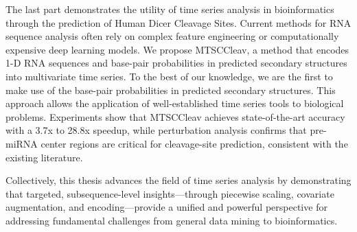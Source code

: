 The last part demonstrates the utility of time series analysis in bioinformatics through the prediction of Human Dicer Cleavage Sites. 
%
Current methods for RNA sequence analysis often rely on complex feature engineering or computationally expensive deep learning models. 
We propose MTSCCleav, a method that encodes 1-D RNA sequences and base-pair probabilities in predicted secondary structures into multivariate time series.
To the best of our knowledge, we are the first to make use of the base-pair probabilities in predicted secondary structures.
This approach allows the application of well-established time series tools to biological problems. 
Experiments show that MTSCCleav achieves state-of-the-art accuracy with a 3.7x to 28.8x speedup, while perturbation analysis confirms that pre-miRNA center regions are critical for cleavage-site prediction, consistent with the existing literature.

Collectively, this thesis advances the field of time series analysis by demonstrating that targeted, subsequence-level insights—through piecewise scaling, covariate augmentation, and encoding—provide a unified and powerful perspective for addressing fundamental challenges from general data mining to bioinformatics.